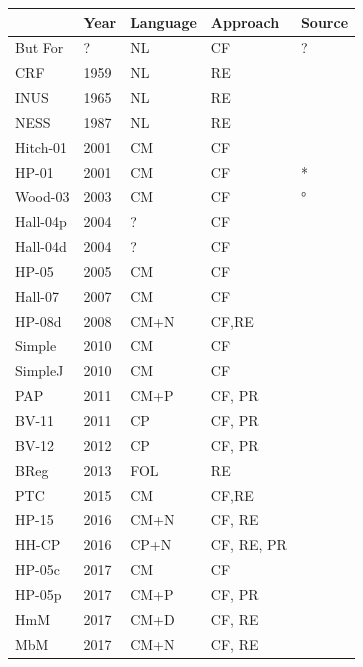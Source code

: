\documentclass[11pt,a4paper]{book}
\theoremstyle{definition}
\theoremstyle{definition}
\theoremstyle{definition}
\theoremstyle{remark}
\begin{document}
\begin{table}
\centering
\scriptsize
\begin{tabular}{lllll}
\toprule
&Year	&Language	& Approach & Source\\
\midrule   
But For &	?	& NL &	 CF & ?\\
CRF	& 1959	& NL	& RE & \parencite{hart1985causation}\\
INUS &	1965 &	NL&	RE& \parencite{mackie1965causes}\\
NESS&	1987&	NL&	RE& \parencite{wright1987causation}\\
Hitch-01&	2001	&CM	&CF& \parencite{hitchcock2001intransitivity}\\
HP-01	&2001	&CM&	CF& \parencite{halpern2005causes}*\\
Wood-03 &	2003 &	CM &	CF& \parencite{woodward2005making}°\\
Hall-04p	&2004	&?  &	CF& \parencite{hall2004two}\\
Hall-04d		&2004	&? &	CF& \parencite{hall2004two}\\
HP-05	&2005	&CM&	CF& \parencite{halpern2005causes}\\
Hall-07	&2007	&CM	&CF& \parencite{hall2007structural}\\
HP-08d &	2008	&CM+N	&CF,RE& \parencite{halpern2008defaults}\\
Simple	&2010	&CM&	CF& \parencite{glymour2010actual}\\
SimpleJ&	2010	&CM	&CF& \parencite{glymour2010actual}\\
PAP	&2011	&CM+P&	CF, PR& \parencite{twardy2011actual}\\
BV-11	& 2011&	CP	&CF, PR& \parencite{vennekens2011actual}\\
BV-12	&2012&	CP	&CF, PR& \parencite{beckers2012counterfactual}\\
BReg	&2013	&FOL	&RE& \parencite{baumgartner2013regularity}\\
PTC &2015	& CM&	CF,RE& \parencite{weslake2015partial}\\
HP-15 & 	2016	& CM+N	&CF, RE & \parencite{halpern2015modification}\\
HH-CP & 	2016	& CP+N	&CF, RE, PR& \parencite{beckers2016general}\\
HP-05c & 2017 & CM & CF & \parencite{fenton2017proposed} \\
HP-05p & 2017 & CM+P& CF, PR & \parencite{fenton2017proposed} \\
HmM &	2017	& CM+D	& CF, RE& \parencite{blanchard2017cause}\\
MbM & 	2017	 & CM+N & 	CF, RE& \parencite{blanchard2017cause}\\

\end{tabular}
\end{table}
\end{document}
